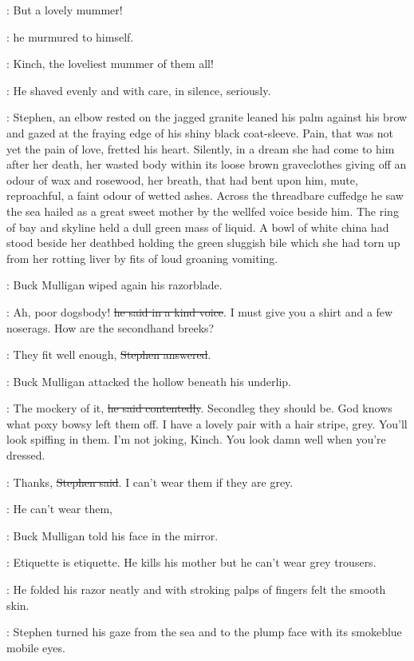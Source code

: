 \Mulligan:
But a lovely mummer!

:
he murmured to himself.

\Mulligan:
Kinch, the loveliest mummer of them all!

:
He shaved evenly and with care,
in silence,
seriously.

:
Stephen, an elbow rested on the jagged granite
leaned his palm against his brow
and gazed at the fraying edge of his shiny black coat-sleeve.
Pain, that was not yet the pain of love,
fretted his heart.
Silently, in a dream
she had come to him after her death,
her wasted body within its loose brown graveclothes
giving off an odour of wax and rosewood,
her breath, that had bent upon him,
mute, reproachful,
a faint odour of wetted ashes.
Across the threadbare cuffedge
he saw the sea hailed as a great sweet mother
by the wellfed voice beside him.
The ring of bay and skyline held a dull green mass of liquid.
A bowl of white china had stood beside her deathbed
holding the green sluggish bile
which she had torn up from her rotting liver
by fits of loud groaning vomiting.

:
Buck Mulligan wiped again his razorblade.

\Mulligan:
Ah, poor dogsbody!
\sout{he said in a kind voice}.
I must give you a shirt and a few noserags.
How are the secondhand breeks?

\Stephen:
They fit well enough,
\sout{Stephen answered}.

:
Buck Mulligan attacked the hollow beneath his underlip.

\Mulligan:
The mockery of it,
\sout{he said contentedly}.
Secondleg they should be.
God knows what poxy bowsy left them off.
I have a lovely pair with a hair stripe, grey.
You'll look spiffing in them.
I'm not joking, Kinch.
You look damn well when you're dressed.

\Stephen:
Thanks,
\sout{Stephen said}.
I can't wear them if they are grey.

\Mulligan:
He can't wear them,

:
Buck Mulligan told his face in the mirror.

\Mulligan:
Etiquette is etiquette.
He kills his mother but he can't wear grey trousers.

:
He folded his razor neatly
and with stroking palps of fingers
felt the smooth skin.

:
Stephen turned his gaze from the sea
and to the plump face
with its smokeblue mobile eyes.

